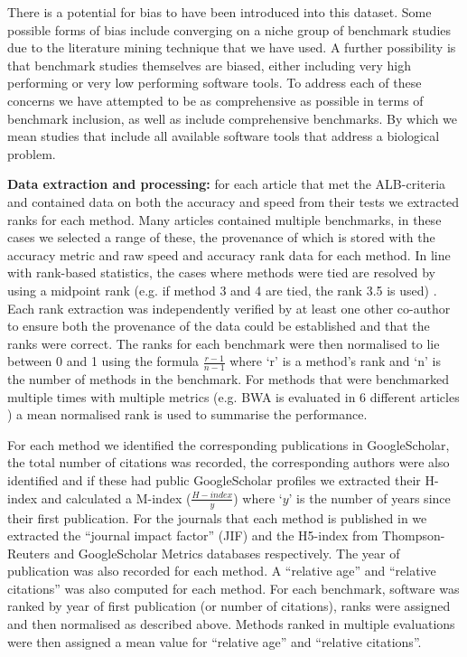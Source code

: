 \documentclass[fleqn,10pt]{SelfArx} %
\begin{document}
There is a potential for bias to have been introduced into this dataset. Some possible forms of bias include converging on a niche group of benchmark studies due to the literature mining technique that we have used. A further possibility is that benchmark studies themselves are biased, either including very high performing or very low performing software tools. To address each of these concerns we have attempted to be as comprehensive as possible in terms of benchmark inclusion, as well as include comprehensive benchmarks. By which we mean studies that include all available software tools that address a biological problem. 

\textbf{Data extraction and processing:} for each article that met the ALB-criteria and contained data on both the accuracy and speed from their tests we extracted ranks for each method. Many articles contained multiple benchmarks, in these cases we selected a range of these, the provenance of which is stored with the accuracy metric and raw speed and accuracy rank data for each method. In line with rank-based statistics, the cases where methods were tied are resolved by using a midpoint rank (e.g. if method 3 and 4 are tied, the rank 3.5 is used) \cite{Mann1947-re}. Each rank extraction was independently verified by at least one other co-author to ensure both the provenance of the data could be established and that the ranks were correct. The ranks for each benchmark were then normalised to lie between 0 and 1 using the formula $\frac{r-1}{n-1}$ where ‘r’ is a method’s rank and ‘n’ is the number of methods in the benchmark. For methods that were benchmarked multiple times with multiple metrics (e.g. BWA is evaluated in 6 different articles \cite{Bao2011-lv,Caboche2014-lj,Hatem2013-cs,Schbath2012-ob,Ruffalo2011-rl,Holtgrewe2011-fd}) a mean normalised rank is used to summarise the performance.
 
For each method we identified the corresponding publications in GoogleScholar, the total number of citations was recorded, the corresponding authors were also identified and if these had public GoogleScholar profiles we extracted their H-index and calculated a M-index ($\frac{H-index}{y}$) where ‘$y$’ is the number of years since their first publication. For the journals that each method is published in we extracted the “journal impact factor” (JIF) and the H5-index from Thompson-Reuters and GoogleScholar Metrics databases respectively. The year of publication was also recorded for each method. A “relative age” and “relative citations” was also computed for each method. For each benchmark, software was ranked by year of first publication (or number of citations), ranks were assigned and then normalised as described above. Methods ranked in multiple evaluations were then assigned a mean value for “relative age” and “relative citations”. 
\end{document}

